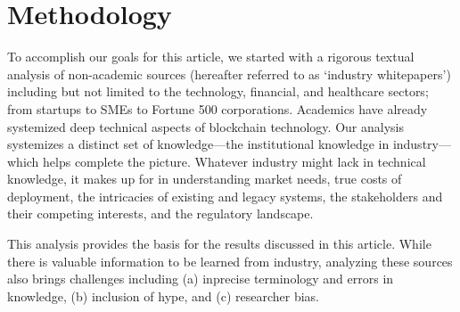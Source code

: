 
\section{Methodology}
\label{sec:method}

To accomplish our goals for this article, we started with a rigorous textual analysis of non-academic sources (hereafter referred to as `industry whitepapers') including but not limited to the technology, financial, and healthcare sectors; from startups to SMEs to Fortune 500 corporations. Academics have already systemized deep technical aspects of blockchain technology. Our analysis  systemizes a distinct set of knowledge---the institutional knowledge in industry---which helps complete the picture. Whatever industry might lack in technical knowledge, it makes up for in understanding market needs, true costs of deployment, the intricacies of existing and legacy systems, the stakeholders and their competing interests, and the regulatory landscape.




This analysis provides the basis for the results discussed in this article. While there is valuable information to be learned from industry, analyzing these sources also brings challenges including (a) inprecise terminology and errors in knowledge, (b) inclusion of hype, and (c) researcher bias.





